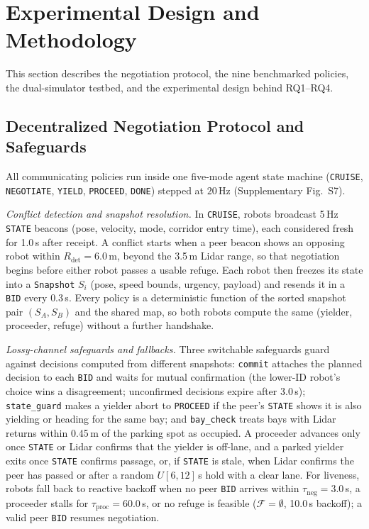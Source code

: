 \section{Experimental Design and Methodology}\label{sec:exp}
This section describes the negotiation protocol, the nine benchmarked policies, the dual-simulator testbed, and the experimental design behind RQ1--RQ4.

\subsection{Decentralized Negotiation Protocol and Safeguards}\label{sec:proto}
All communicating policies run inside one five-mode agent state machine (\texttt{CRUISE}, \texttt{NEGOTIATE}, \texttt{YIELD}, \texttt{PROCEED}, \texttt{DONE}) stepped at $20$\,Hz (Supplementary Fig.~S7).



\emph{Conflict detection and snapshot resolution.} In \texttt{CRUISE}, robots broadcast 5\,Hz \texttt{STATE} beacons (pose, velocity, mode, corridor entry time), each considered fresh for 1.0\,s after receipt. A conflict starts when a peer beacon shows an opposing robot within $R_{\mathrm{det}} = 6.0$\,m, beyond the 3.5\,m Lidar range, so that negotiation begins before either robot passes a usable refuge. Each robot then freezes its state into a \texttt{Snapshot} $S_i$ (pose, speed bounds, urgency, payload) and resends it in a \texttt{BID} every $0.3$\,s. Every policy is a deterministic function of the sorted snapshot pair $(S_A, S_B)$ and the shared map, so both robots compute the same (yielder, proceeder, refuge) without a further handshake.

\emph{Lossy-channel safeguards and fallbacks.} Three switchable safeguards guard against decisions computed from different snapshots: \texttt{commit} attaches the planned decision to each \texttt{BID} and waits for mutual confirmation (the lower-ID robot's choice wins a disagreement; unconfirmed decisions expire after 3.0\,s); \texttt{state\_guard} makes a yielder abort to \texttt{PROCEED} if the peer's \texttt{STATE} shows it is also yielding or heading for the same bay; and \texttt{bay\_check} treats bays with Lidar returns within 0.45\,m of the parking spot as occupied. A proceeder advances only once \texttt{STATE} or Lidar confirms that the yielder is off-lane, and a parked yielder exits once \texttt{STATE} confirms passage, or, if \texttt{STATE} is stale, when Lidar confirms the peer has passed or after a random $U[6,12]$\,s hold with a clear lane. For liveness, robots fall back to reactive backoff when no peer \texttt{BID} arrives within $\tau_{\mathrm{neg}} = 3.0$\,s, a proceeder stalls for $\tau_{\mathrm{proc}} = 60.0$\,s, or no refuge is feasible ($\mathcal{F}=\emptyset$, 10.0\,s backoff); a valid peer \texttt{BID} resumes negotiation.

